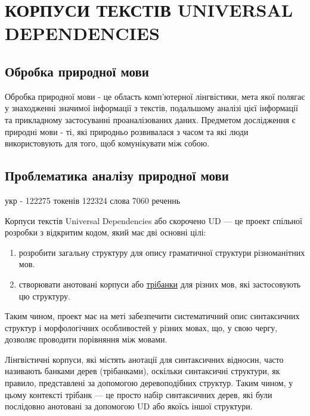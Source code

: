 \section{КОРПУСИ ТЕКСТІВ UNIVERSAL DEPENDENCIES}



\subsection{Обробка природної мови}
Обробка природної мови - це область комп'ютерної лінгвістики, мета якої полягає у
знаходженні значимої інформації з текстів, подальшому аналізі цієї інформації
та прикладному застосуванні проаналізованих даних. Предметом дослідження є
природні мови - ті, які природньо розвивалася з часом та які люди використовують для того,
щоб комунікувати між собою.

\subsection{Проблематика аналізу природної мови}

укр - 122275 токенів 122324 слова 7060 реченнь

Корпуси текстів Universal Dependencies або скорочено UD — це проект спільної розробки
з відкритим кодом, який має дві основні цілі:

\begin{enumerate}
    \item розробити загальну структуру для опису граматичної структури різноманітних мов.
    \cite{bib1}
    \item створювати анотовані корпуси або \hyperlink{term0}{трібанки} для різних мов,
    які застосовують цю структуру. \cite{bib2}
\end{enumerate}

Таким чином, проект має на меті забезпечити систематичний опис синтаксичних структур і
морфологічних особливостей у різних мовах, що, у свою чергу, дозволяє проводити порівняння
між мовами.

Лінгвістичні корпуси, які містять анотації для синтаксичних відносин,
часто називають банками дерев (трібанками), оскільки синтаксичні структури, як правило,
представлені за допомогою деревоподібних структур. Таким чином, у цьому контексті трібанк —
це просто набір синтаксичних дерев, які були послідовно анотовані за допомогою UD
або якоїсь іншої структури.

